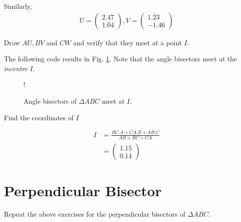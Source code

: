 \documentclass[journal,12pt,twocolumn]{IEEEtran}
\begin{document}
%
Similarly,
\begin{align}
U=
\begin{pmatrix}
2.47
\\
1.04
\end{pmatrix},
V =
\begin{pmatrix}
1.23
\\
-1.46
\end{pmatrix}
\end{align}
\begin{problem}
Draw $AU, BV$ and $CW$ and verify that they meet at a point $I$.  
\end{problem}
\solution The following code results in Fig. \ref{fig:bisect_def}. Note that the angle bisectors meet at the {\em incentre} $I$.

\begin{figure}[!h]
\centering
\resizebox {\columnwidth} {!} {

}
\caption{Angle bisectors of $\Delta ABC$ meet at $I$.}
\label{fig:bisect_def}
\end{figure}
%
\begin{problem}
Find the coordinates of $I$
\end{problem}
\solution 
\begin{align}
I &= \frac{BC.A + CA.B + AB.C}{AB+BC+CA}
\\
& = 
\begin{pmatrix}
1.15
\\
0.14
\end{pmatrix}
\end{align}
%
\section{Perpendicular Bisector}
\begin{problem}
Repeat the above exercises for the perpendicular bisectors of $\Delta ABC$.
\end{problem}
%

% 
% 
%
\end{document}
